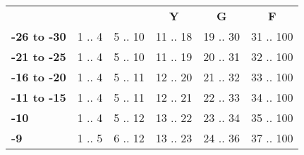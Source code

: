 \documentclass[oneside]{book}
\begin{document}
\begin{table}[h]
\begin{tabular}{lccccc}
\multicolumn{1}{c|}{} & \cellcolor[HTML]{333333}{\color[HTML]{FFFFFF} \textbf{B}} & \cellcolor[HTML]{FE0000}{\color[HTML]{FFFFFF}\textbf{R}} & \multicolumn{1}{c|}{\cellcolor[HTML]{F8FF00}\textbf{Y}} & \multicolumn{1}{c|}{\cellcolor[HTML]{34FF34}\textbf{G}} & \multicolumn{1}{c|}{\cellcolor[HTML]{C0C0C0}\textbf{F}} \\
\rowcolor[HTML]{FFFFFF} 
{\color[HTML]{000000} \textbf{-26 to -30}} & {\color[HTML]{333333} 1 .. 4}                             & 5 .. 10                            & 11 .. 18                                               & 19 .. 30                                               & 31 .. 100                                              \\
\rowcolor[HTML]{EFEFEF} 
\textbf{-21 to -25}                        & {\color[HTML]{333333} 1 .. 4}                             & 5 .. 10                            & 11 .. 19                                               & 20 .. 31                                               & 32 .. 100                                              \\
\rowcolor[HTML]{FFFFFF} 
\textbf{-16 to -20}                        & {\color[HTML]{333333} 1 .. 4}                             & 5 .. 11                            & 12 .. 20                                               & 21 .. 32                                               & 33 .. 100                                              \\
\rowcolor[HTML]{EFEFEF} 
\textbf{-11 to -15}                        & {\color[HTML]{333333} 1 .. 4}                             & 5 .. 11                            & 12 .. 21                                               & 22 .. 33                                               & 34 .. 100                                              \\
\rowcolor[HTML]{FFFFFF} 
\textbf{-10}                               & {\color[HTML]{333333} 1 .. 4}                             & 5 .. 12                            & 13 .. 22                                               & 23 .. 34                                               & 35 .. 100                                              \\
\rowcolor[HTML]{EFEFEF} 
\textbf{-9}                                & {\color[HTML]{333333} 1 .. 5}                             & 6 .. 12                            & 13 .. 23                                               & 24 .. 36                                               & 37 .. 100                                              \\

\end{tabular}
\end{table}
\end{document}
